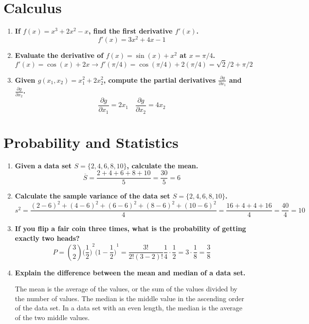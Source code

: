 \documentclass{article}
\begin{document}
\section*{Calculus}
\begin{enumerate}
    \item \textbf{If $f(x)=x^3+2x^2-x$, find the first derivative $f'(x)$.}
    \[f'(x)=3x^2+4x-1\]
    \item \textbf{Evaluate the derivative of $f(x)=\sin (x)+x^2$ at $x=\pi / 4$.}
    \[f'(x)=\cos (x)+2x \rightarrow f'(\pi/4)=\cos(\pi/4)+2(\pi / 4)= \sqrt{2}/2 + \pi / 2\]
    \item \textbf{Given $g(x_1, x_2)=x_1^2+2x_2^2$, compute the partial derivatives $\frac{\partial g}{\partial x_1}$ and $\frac{\partial g}{\partial x_2}$.}
    \[\frac{\partial g}{\partial x_1}=2x_1\quad \frac{\partial g}{\partial x_2}=4x_2\]
\end{enumerate}

\pagebreak

\section*{Probability and Statistics}
\begin{enumerate}
    \item \textbf{Given a data set $S=\{2, 4, 6, 8, 10\}$, calculate the mean.}
    \[\overline{S}=\frac{2+4+6+8+10}{5}=\frac{30}{5}=6\]
    \item \textbf{Calculate the sample variance of the data set $S=\{2, 4, 6, 8, 10\}$.}
    \[s^2 = \frac{{(2-6)}^2+{(4-6)}^2+{(6-6)}^2+{(8-6)}^2+{(10-6)}^2}{4}=\frac{16+4+4+16}{4}=\frac{40}{4}=10\]
    \item \textbf{If you flip a fair coin three times, what is the probability of getting exactly two heads?}
    \[P=\binom{3}{2}{\Bigg(\frac{1}{2}\Bigg)}^2{\Bigg(1-\frac{1}{2}\Bigg)}^1=\frac{3!}{2!(3-2)!}\frac{1}{4}\cdot\frac{1}{2}=3\cdot \frac{1}{8}=\frac{3}{8}\]
    \item \textbf{Explain the difference between the mean and median of a data set.}
    
    The mean is the average of the values, or the sum of the values divided by the number of values. The median is the  middle value in the ascending order of the data set. In a data set with an even length, the median is the average of the two middle values.
\end{enumerate}
\end{document}
